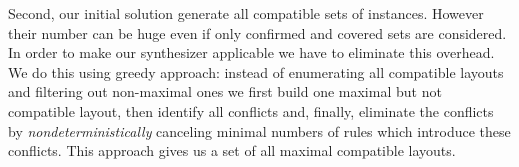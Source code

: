 %
%
%

Second, our initial solution generate all compatible sets of instances.
However their number can be huge even if only confirmed and covered sets are considered.
In order to make our synthesizer applicable we have to eliminate this overhead.
We do this using greedy approach: instead of enumerating all compatible layouts and
filtering out non-maximal ones we first build one maximal but not compatible layout, then identify all conflicts and,
finally, eliminate the conflicts by \emph{nondeterministically} canceling minimal numbers of rules which introduce these conflicts.
This approach gives us a set of all maximal compatible layouts.

